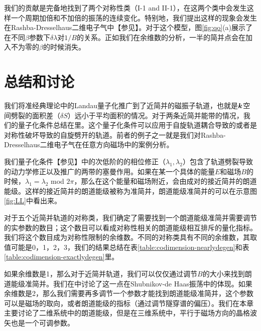 我们的贡献是完备地找到了两个对称性类（I-1 and II-1），在这两个类中会发生这样一个周期加倍和不加倍的振荡的连续变化。特别地，我们提出这样的现象会发生在Rashba-Dresselhaus二维电子气中【参见】。对于这个模型，图\ref{fig:qo}(a)展示了在不同$\beta$参数下$\delta \lambda$对$1/B$的关系。正如我们在余维数的分析，一半的简并点会在加入不为零的$\beta$的时候消失。

\section{总结和讨论}\label{sec:discussion}

我们将准经典理论中的Landau量子化推广到了近简并的磁振子轨道，也就是$\boldsymbol{k}$空间劈裂的面积差（$\delta S$）远小于平均面积的情况。对于两条近简并能带的情况，我们的量子化条件总结在里。这个量子化条件可以应用于自旋轨道耦合导致的或者是对称性破坏导致的自旋劈开的轨道。前者的例子之一就是我们对Rashba-Dresselhaus二维电子气在任意方向磁场中的案例分析。

我们量子化条件【参见】中的次低阶的的相位修正（$\lambda_1,\lambda_2$）包含了轨道劈裂导致的动力学修正以及推广的两带的塞曼作用。如果在某一个具体的能量$E$和磁场$B$的时候，$\lambda_1{=}\lambda_2$ mod $2\pi$，那么在这个能量和磁场附近，会由成对的接近简并的朗道能级。这样的接近简并的朗道能级被称为准简并，朗道能级准简并的可以在示意图\ref{fig:LL}中看出来。


对于五个近简并轨道的对称类，我们确定了需要找到一个朗道能级准简并需要调节的实参数的数目；这个数目可以看成对称性相关的朗道能级相互排斥的量化指标。我们将这个数目成为对称性限制的余维数。不同的对称类具有不同的余维数，其取值可能是0，1，2，3，我们的结果总结在表\ref{table:codimension-nearlydegen}和表\ref{table:codimension-exactlydegen}里。

如果余维数是1，那么对于近简并轨道，我们可以仅仅通过调节$B$的大小来找到朗道能级准简并。我们在中讨论了这一点在Shubnikov-de Haas振荡中的体现。如果余维数是2，那么我们需要再多调节一个参数才能找到朗道能级准简并，这个参数可以是磁场的取向\cite{yakovenko_angular_2006}，或者朗道能级的指标（通过调节隧穿谱的偏压）\cite{Sangjun_Cd3As2,Ilija_SnTe,kushwaha_Dirac}。我们在本章主要讨论了二维系统中的朗道能级，但是在三维系统中，平行于磁场方向的晶格波矢也是一个可调参数。


